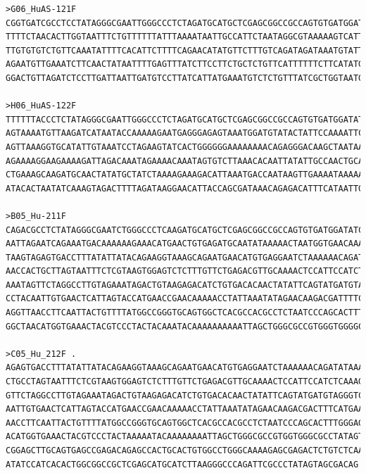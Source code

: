 \begin{verbatim}
>G06_HuAS-121F
CGGTGATCGCCTCCTATAGGGCGAATTGGGCCCTCTAGATGCATGCTCGAGCGGCCGCCAGTGTGATGGATATCTGCAGAATTCGCCCTTGGCCACGCGTCGACTAGTACTTTTTTTTTT
TTTTCTAACACTTGGTAATTTCTGTTTTTTATTTAAAATAATTGCCATTCTAATAGGCGTAAAAAGTCATTATGGTCTTAATTTACATTTTCTTCATGACTGCTGTTGAGAAGTTTTCTT
TTGTGTGTCTGTTCAAATATTTTCACATTCTTTTCAGAACATATGTTCTTTGTCAGATAGATAAATGTATTTCTTCTGTATCCTTACTGATTTTCTGTCCACTTACTAATTACCGAGGGA
AGAATGTTGAAATCTTCAACTATAATTTTGAGTTTATCTTCCTTCTGCTCTGTTCATTTTTTCTTCATATGCTTTGAAGCAAAGTCTTTAAAGTTGTGTCCTTAGGTGTGTTCACATTTA
GGACTGTTAGATCTCCTTGATTAATTGATGTCCTTATCATTATGAAATGTCTCTGTTTATCGCTGGTAATGTTCCTTAT

>H06_HuAS-122F
TTTTTTACCCTCTATAGGGCGAATTGGGCCCTCTAGATGCATGCTCGAGCGGCCGCCAGTGTGATGGATATCTGCAGAATTCGCCCTTAACGCTGCTGTGGAATCTATAACACATATAGA
AGTAAAATGTTAAGATCATAATACCAAAAAGAATGAGGGAGAGTAAATGGATGTATACTATTCCAAAATTCTTACATTATACATTAAGAGGAATAATATTTTTGAAGGTAGATTGAGGTA
AGTTAAAGGTGCATATTGTAAATCCTAGAAGTATCACTGGGGGGAAAAAAAACAGAGGGACAAGCTAATAATGGAGACAATACAAAATTCCAAAAATGCTCCATTAACCGAAAAGAAGGC
AGAAAAGGAAGAAAAGATTAGACAAATAGAAAACAAATAGTGTCTTAAACACAATTATATTGCCAACTGCAATAAATGTAAATGGACTTAATCAAAAAGCAACGATCGTAAAAAGTCAAT
CTGAAAGCAAGATGCAACTATATGCTATCTAAAAGAAAGACATTAAATGACCAATAAGTTGAAAATAAAAACACAGCAAAATGATATAATGTGCAAAAATTAATCATAAGAAAGGAATGG
ATACACTAATATCAAAGTAGACTTTTAGATAAGGAACATTACCAGCGATAAACAGAGACATTTCATAATTGATAAAGACATCAATTTAATCAAGGAGTATCTAAACAGTCCCTTAAATG

>B05_Hu-211F
CAGACGCCTCTATAGGGCGAATCTGGGCCCTCAAGATGCATGCTCGAGCGGCCGCCAGTGTGATGGATATCTGCAGAATTCGCCCTTCAGTGAACGCCAAACAAGTAAGATTAGAATTAC
AATTAGAATCAGAAATGACAAAAAAGAAACATGAACTGTGAGATGCAATATAAAAACTAATGGTGAACAAAGCAAAGAATAAAAAATAAAAACGGAAAGATTAAAAGGAAAATGTGACTG
TAAGTAGAGTGACCTTTATATTATACAGAAGGTAAAGCAGAATGAACATGTGAGGAATCTAAAAAACAGATATAAAATAGAAACAACTGAAGGCTTATATAATTAGTCTATAAAGCTAGG
AACCACTGCTTAGTAATTTCTCGTAAGTGGAGTCTCTTTGTTCTGAGACGTTGCAAAACTCCATTCCATCTCAAAGTTATTTTTAATGTTAAAATTTGTAAGAGTGAGCAACGGTATCCT
AAATAGTTCTAGGCCTTGTAGAAATAGACTGTAAGAGACATCTGTGACACAACTATATTCAGTATGATGTAGGGTCTGTTACAATGGGATGAAGTGAATTTAGATTATTTCAAGACTAAA
CCTACAATTGTGAACTCATTAGTACCATGAACCGAACAAAAACCTATTAAATATAGAACAAGACGATTTTCATGAAAAAATAAATATGAACAAATCAGTATTTTCAGTTGTTTGAAATAT
AGGTTAACCTTCAATTACTGTTTTATGGCCGGGTGCAGTGGCTCACGCCACGCCTCTAATCCCAGCACTTTGGGAGGCCGAGGCAGGCGGATCATGAGGTCAGGAGATCGAGACCATCCT
GGCTAACATGGTGAAACTACGTCCCTACTACAAATACAAAAAAAAAATTAGCTGGGCGCCGTGGGTGGGGCGCCTATAGTCCCAAGCT

>C05_Hu_212F .
AGAGTGACCTTTATATTATACAGAAGGTAAAGCAGAATGAACATGTGAGGAATCTAAAAAACAGATATAAAATAGAAACAACTGAAGGCTTATATAATTAGTCTATAAAGCTAGGAACCA
CTGCCTAGTAATTTCTCGTAAGTGGAGTCTCTTTGTTCTGAGACGTTGCAAAACTCCATTCCATCTCAAAGTTATTTTTAATGTTAAAATTTGTAAGAGTGAGCAACGGTATCCTAAATA
GTTCTAGGCCTTGTAGAAATAGACTGTAAGAGACATCTGTGACACAACTATATTCAGTATGATGTAGGGTCTGTTACAATGGGATGAAGTGAATTTAGATTATTTCAAGACTAAACCTAC
AATTGTGAACTCATTAGTACCATGAACCGAACAAAAACCTATTAAATATAGAACAAGACGACTTTCATGAAAAAATAAATATGAACAAATCAGTATTTTCAGTTGTTTGAAATATAGGTT
AACCTTCAATTACTGTTTTATGGCCGGGTGCAGTGGCTCACGCCACGCCTCTAATCCCAGCACTTTGGGAGGCCGAGGCAGGCGGATCATGAGGTCAGGAGATCGAGACCATCCTGGCTA
ACATGGTGAAACTACGTCCCTACTAAAAATACAAAAAAAATTAGCTGGGCGCCGTGGTGGGCGCCTATAGTCCCAGCTACTTGGGAGGCTGATGCAGAAGAATGGCATGAACCCGGGAGG
CGGAGCTTGCAGTGAGCCGAGACAGAGCCACTGCACTGTGGCCTGGGCAAAAGAGCGAGACTCTGTCTCAAAAAAAAAAAAAAGTACTAGTCGACGCGTGGCCAAGGGCGAATTCTGCAG
ATATCCATCACACTGGCGGCCGCTCGAGCATGCATCTTAAGGGCCCAGATTCGCCCTATAGTAGCGACAG


\end{verbatim}
